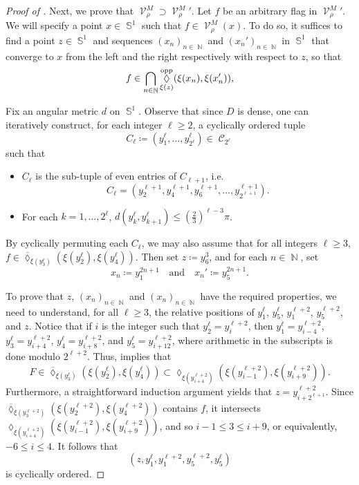 \documentclass{amsart}
\theoremstyle{plain}
\theoremstyle{definition}
\DeclareMathOperator{\Diam}{\lozenge}
\newcommand{\bdext}{{\Vc^M_\rho}}
\DeclareMathOperator{\Cc}{\mathcal{C}}
\DeclareMathOperator{\Vc}{\mathcal{V}}
\DeclareMathOperator{\Nb}{{\mathbb{N}}}
\DeclareMathOperator{\Sb}{\mathbb{S}}
\newcommand{\opp}{\textnormal{opp}}
\newcommand{\1}{\mathbf{1}}
\begin{document}
\begin{proof}[Proof of ]
    
Next, we prove that $\bdext \supset \bdext'$. Let $f$ be an arbitrary flag in $\bdext'$. We will specify a point $x\in\Sb^1$ such that $f\in\bdext(x)$. To do so, it suffices to find a point $z\in\Sb^1$ and sequences $(x_n)_{n\in\Nb}$ and $(x_n')_{n\in\Nb}$ in $\Sb^1$ that converge to $x$ from the left and the right respectively with respect to $z$, so that 
\[f\in \bigcap_{n\in\Nb} \Diam^\opp_{\xi(z)}(\xi(x_n),\xi(x_n')),\]
    
Fix an angular metric $d$ on $\Sb^1$. Observe that since $D$ is dense, one can iteratively construct, for each integer $\ell\ge 2$, a cyclically ordered tuple 
\[C_\ell\coloneqq(y_1^\ell,\dots,y_{2^\ell}^\ell)\in\Cc_{2^\ell}\] 
such that 
\begin{itemize}
\item $C_\ell$ is the sub-tuple of even entries of $C_{\ell+1}$, i.e.
\[C_\ell=(y_2^{\ell+1},y_4^{\ell+1},y_6^{\ell+1},\dots,y_{2^{\ell+1}}^{\ell+1}).\]
\item For each $k=1,\dots,2^\ell$, $d(y_k^\ell,y_{k+1}^\ell)\le (\frac{2}{3})^{\ell-3}\pi$.
\end{itemize}
By cyclically permuting each $C_\ell$, we may also assume that for all integers $\ell\ge 3$, $f\in\overline{\Diam}_{\xi(y_3^\ell)}(\xi(y_2^\ell),\xi(y_4^\ell))$. Then set $z\coloneqq y_6^3$, and for each $n\in\Nb$, set
\[x_n\coloneqq y_1^{2n+1}\quad\text{and}\quad x_n'\coloneqq y_5^{2n+1}.\]

To prove that $z$, $(x_n)_{n\in\Nb}$ and $(x_n)_{n\in\Nb}$ have the required properties, we need to understand, for all $\ell\ge 3$, the relative positions of $y_1^\ell$, $y_5^\ell$, $y_1^{\ell+2}$, $y_5^{\ell+2}$, and $z$. Notice that if $i$ is the integer such that $y_2^\ell=y_i^{\ell+2}$, then $y_1^\ell=y_{i-4}^{\ell+2}$, $y_3^\ell=y_{i+4}^{\ell+2}$, $y_4^{\ell}=y_{i+8}^{\ell+2}$, and $y_5^{\ell}=y_{i+12}^{\ell+2}$, where arithmetic in the subscripts is done modulo $2^{\ell+2}$. Thus,  implies that 
\[F\in\overline{\Diam}_{\xi(y_3^\ell)}\left(\xi(y_2^\ell),\xi(y_4^\ell)\right)\subset\Diam_{\xi(y_{i+4}^{\ell+2})}\left(\xi(y_{i-1}^{\ell+2}),\xi(y_{i+9}^{\ell+2})\right).\]
Furthermore, a straightforward induction argument yields that $z=y^{\ell+2}_{i+2^{\ell+1}}$. Since $\overline{\Diam}_{\xi(y_3^{\ell+2})}\left(\xi(y_2^{\ell+2}),\xi(y_4^{\ell+2})\right)$ contains $f$, it intersects $\Diam_{\xi(y_{i+4}^{\ell+2})}\left(\xi(y_{i-1}^{\ell+2}),\xi(y_{i+9}^{\ell+2})\right)$, and so $i-1\le 3\le i+9$, or equivalently, $-6\le i\le 4$. It follows that
\[(z,y_1^\ell,y_1^{\ell+2},y_5^{\ell+2},y_5^\ell)\] 
is cyclically ordered. 


\end{proof}
\end{document}
